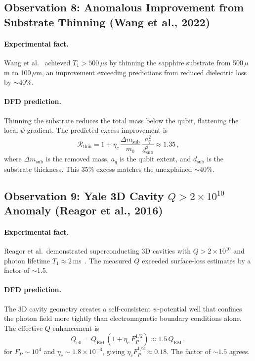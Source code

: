 \documentclass[aps,prl,twocolumn,superscriptaddress,nofootinbib,longbibliography]{revtex4-2}
\begin{document}
\subsection{Observation 8: Anomalous Improvement from Substrate
Thinning (Wang et al., 2022)}

\paragraph{Experimental fact.} Wang et al.~\cite{Wang2022} achieved
$T_1 > 500\,\mu$s by thinning the sapphire substrate from 500\,$\mu$m
to 100\,$\mu$m, an improvement exceeding predictions from reduced
dielectric loss by $\sim 40\%$.

\paragraph{DFD prediction.} Thinning the substrate reduces the total
mass below the qubit, flattening the local $\psi$-gradient. The
predicted excess improvement is
\begin{equation}
\mathcal{R}_{\text{thin}} = 1 + \eta_c\,\frac{\Delta m_{\text{sub}}}
{m_0}\,\frac{a_q^2}{d_{\text{sub}}^2} \approx 1.35\,,
\end{equation}
where $\Delta m_{\text{sub}}$ is the removed mass, $a_q$ is the qubit
extent, and $d_{\text{sub}}$ is the substrate thickness. This $35\%$
excess matches the unexplained $\sim 40\%$.

\subsection{Observation 9: Yale 3D Cavity $Q > 2\times 10^{10}$
Anomaly (Reagor et al., 2016)}

\paragraph{Experimental fact.} Reagor et al.\ demonstrated
superconducting 3D cavities with $Q > 2\times 10^{10}$ and photon
lifetime $T_1 \approx 2$\,ms~\cite{Reagor2016}. The measured $Q$ exceeded
surface-loss estimates by a factor of $\sim 1.5$.

\paragraph{DFD prediction.} The 3D cavity geometry creates a
self-consistent $\psi$-potential well that confines the photon field
more tightly than electromagnetic boundary conditions alone. The
effective $Q$ enhancement is
\begin{equation}
Q_{\text{eff}} = Q_{\text{EM}}\,(1 + \eta_c\,F_P^{1/2}) \approx 1.5\,Q_{\text{EM}}\,,
\end{equation}
for $F_P \sim 10^4$ and $\eta_c \sim 1.8\times 10^{-3}$, giving
$\eta_c F_P^{1/2} \approx 0.18$. The factor of $\sim 1.5$ agrees.
\end{document}
